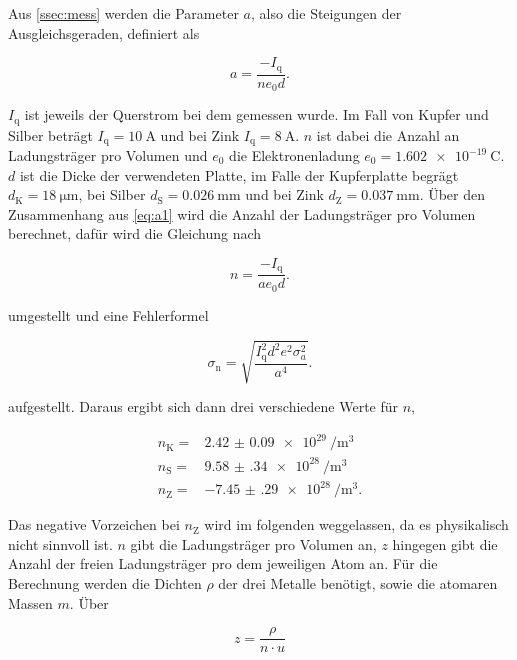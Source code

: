 Aus \autoref{ssec:mess} werden die Parameter $a$, also die Steigungen der Ausgleichsgeraden, definiert als

\begin{equation}
    a = \frac{-I_\text{q}}{n e_0 d}.
    \label{eq:a1}
\end{equation}

$I_\text{q}$ ist jeweils der Querstrom bei dem gemessen wurde.
Im Fall von Kupfer und Silber beträgt $I_\text{q} = \SI{10}{\ampere}$ und bei Zink $I_\text{q} = \SI{8}{\ampere}$.
$n$ ist dabei die Anzahl an Ladungsträger pro Volumen und $e_0$ die Elektronenladung $e_0 = \SI{1.602e-19}{\coulomb}$. 
$d$ ist die Dicke der verwendeten Platte, im Falle der Kupferplatte begrägt $d_\text{K} = \SI{18}{\micro\meter}$, bei Silber $d_\text{S} = \SI{0.026}{\milli\meter}$ und bei Zink $d_\text{Z} = \SI{0.037}{\milli\meter}$.
Über den Zusammenhang aus \autoref{eq:a1} wird die Anzahl der Ladungsträger pro Volumen berechnet, dafür wird die Gleichung nach 

\begin{equation}
    n = \frac{-I_\text{q}}{a e_0 d}.
    \label{eq:n}
\end{equation}

umgestellt und eine Fehlerformel 

\begin{equation}
    \sigma _\text{n} = \sqrt{\frac {I_\text{q}^{2} d^{2} e^{2} \sigma_{a}^{2} }{a^{4}}}.
    \label{eq:n_fehler}
\end{equation}

aufgestellt.
Daraus ergibt sich dann drei verschiedene Werte für $n$,

\begin{align}
    n_\text{K} =& \SI{2.42(9)e29}{\per\cubic\meter} \\
    n_\text{S} =& \SI{9.58(34)e28}{\per\cubic\meter} \\
    n_\text{Z} =& \SI{-7.45(29)e28}{\per\cubic\meter}.
    \label{eq:n1}
\end{align}

Das negative Vorzeichen bei $n_\text{Z}$ wird im folgenden weggelassen, da es physikalisch nicht sinnvoll ist.
$n$ gibt die Ladungsträger pro Volumen an, $z$ hingegen gibt die Anzahl der freien Ladungsträger pro dem jeweiligen Atom an. 
Für die Berechnung werden die Dichten $\rho$ der drei Metalle benötigt, sowie die atomaren Massen $m$.
Über 

\begin{equation}
    z = \frac{\rho}{n \cdot u}
    \label{eq:nproatom}
\end{equation}

